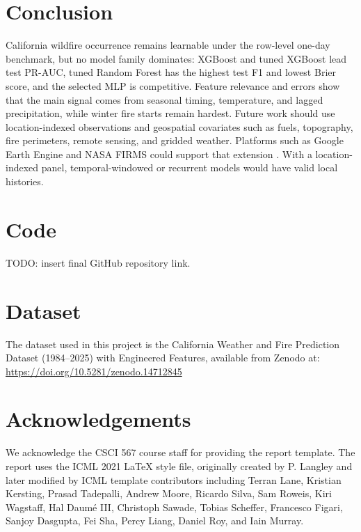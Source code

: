 \documentclass{article}
\begin{document}
\section{Conclusion}

California wildfire occurrence remains learnable under the row-level one-day benchmark, but no model family dominates: XGBoost and tuned XGBoost lead test PR-AUC, tuned Random Forest has the highest test F1 and lowest Brier score, and the selected MLP is competitive. Feature relevance and errors show that the main signal comes from seasonal timing, temperature, and lagged precipitation, while winter fire starts remain hardest. Future work should use location-indexed observations and geospatial covariates such as fuels, topography, fire perimeters, remote sensing, and gridded weather. Platforms such as Google Earth Engine and NASA FIRMS could support that extension \citep{gorelick2017gee,nasafirms}. With a location-indexed panel, temporal-windowed or recurrent models would have valid local histories.

\clearpage



\appendix

\section{Code}
\label{app:code}
TODO: insert final GitHub repository link.

\section{Dataset}
\label{app:dataset}
The dataset used in this project is the California Weather and Fire Prediction Dataset (1984--2025) with Engineered Features, available from Zenodo at:\\
\url{https://doi.org/10.5281/zenodo.14712845}

\section{Acknowledgements}
\label{app:acknowledgements}
We acknowledge the CSCI 567 course staff for providing the report template. The report uses the ICML 2021 \LaTeX{} style file, originally created by P. Langley and later modified by ICML template contributors including Terran Lane, Kristian Kersting, Prasad Tadepalli, Andrew Moore, Ricardo Silva, Sam Roweis, Kiri Wagstaff, Hal Daum\'e III, Christoph Sawade, Tobias Scheffer, Francesco Figari, Sanjoy Dasgupta, Fei Sha, Percy Liang, Daniel Roy, and Iain Murray.
\end{document}
